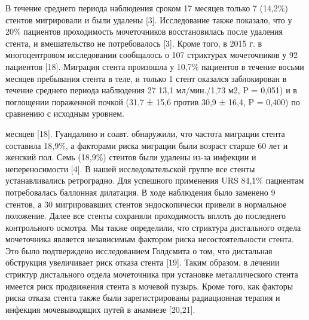 В течение среднего периода наблюдения сроком 17 месяцев только 7 (14,2\%) стентов мигрировали и были удалены [3]. Исследование также показало, что у 20\% пациентов проходимость мочеточников восстановилась после удаления стента, и вмешательство не потребовалось [3]. Кроме того, в 2015 г. в многоцентровом исследовании сообщалось о 107 стриктурах мочеточников у 92 пациентов [18]. Миграция стента произошла у 10,7\% пациентов в течение восьми месяцев пребывания стента в теле, и только 1 стент оказался заблокирован в течение среднего периода наблюдения 27 13,1 мл/мин./1,73 м2, P = 0,051) и в поглощении пораженной почкой (31,7 ± 15,6 против 30,9 ± 16,4, P = 0,400) по сравнению с исходным уровнем.

месяцев [18]. Гуандалино и соавт. обнаружили, что частота миграции стента составила 18,9\%, а факторами риска миграции были возраст старше 60 лет и женский пол. Семь (18,9\%) стентов были удалены из-за инфекции и непереносимости [4].
В нашей исследовательской группе все стенты устанавливались ретроградно. Для успешного применения URS 84,1\% пациентам потребовалась баллонная дилатация. В ходе наблюдения было заменено 9 стентов, а 30 мигрировавших стентов эндоскопически привели в нормальное положение. Далее все стенты сохраняли проходимость вплоть до последнего контрольного осмотра. Мы также определили, что стриктура дистального отдела мочеточника является независимым фактором риска несостоятельности стента. Это было подтверждено исследованием Голдсмита о том, что дистальная обструкция увеличивает риск отказа стента [19]. Таким образом, в лечении стриктур дистального отдела мочеточника при установке металлического стента имеется риск продвижения стента в мочевой пузырь. Кроме того, как факторы риска отказа стента также были зарегистрированы радиационная терапия и инфекция мочевыводящих путей в анамнезе [20,21].

